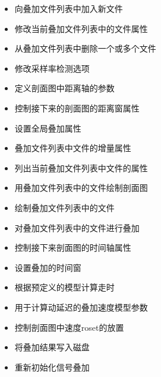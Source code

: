 \begin{itemize}
\item {} 向叠加文件列表中加入新文件
\item {} 修改当前叠加文件列表中的文件属性
\item {} 从叠加文件列表中删除一个或多个文件
\item {} 修改采样率检测选项
\item {} 定义剖面图中距离轴的参数
\item {} 控制接下来的剖面图的距离窗属性
\item {} 设置全局叠加属性
\item {} 叠加文件列表中文件的增量属性
\item {} 列出当前叠加文件列表中文件的属性
\item {} 用叠加文件列表中的文件绘制剖面图
\item {} 绘制叠加文件列表中的文件
\item {} 对叠加文件列表中的文件进行叠加
\item {} 控制接下来剖面图的时间轴属性
\item {} 设置叠加的时间窗
\item {} 根据预定义的模型计算走时
\item {} 用于计算动延迟的叠加速度模型参数
\item {} 控制剖面图中速度roset的放置
\item {} 将叠加结果写入磁盘
\item {} 重新初始化信号叠加
\end{itemize}
